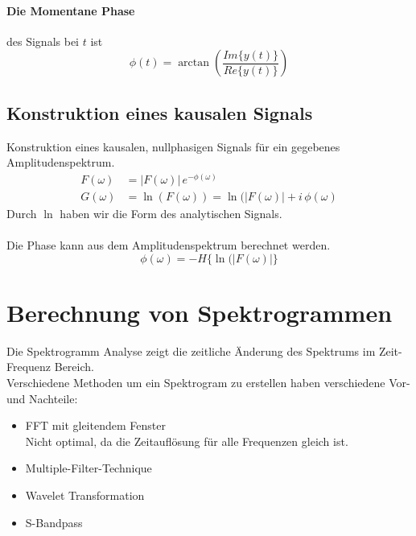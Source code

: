 \paragraph{Die Momentane Phase} des Signals bei $t$ ist
\[
\phi(t) = \arctan\left( \frac{Im\{y(t)\}}{Re\{y(t)\}} \right)
\]
\subsection{Konstruktion eines kausalen Signals}
Konstruktion eines kausalen, nullphasigen Signals für ein gegebenes Amplitudenspektrum.
\[
\begin{split}
F(\omega) & = |F(\omega)|\, e^{-\phi(\omega)}\\
G(\omega) & = \ln(F(\omega)) = \ln(|F(\omega)| + i\,\phi(\omega)
\end{split}
\]
Durch $\ln$ haben wir die Form des analytischen Signals.\\\\
Die Phase kann aus dem Amplitudenspektrum berechnet werden.
\[
\phi(\omega) = -H\{\ln(|F(\omega)|\}
\]

\section{Berechnung von Spektrogrammen}
Die Spektrogramm Analyse zeigt die zeitliche Änderung des Spektrums im Zeit-Frequenz Bereich.\\
Verschiedene Methoden um ein Spektrogram zu erstellen haben verschiedene Vor- und Nachteile:
\begin{itemize}
\item FFT mit gleitendem Fenster\\
Nicht optimal, da die Zeitauflösung für alle Frequenzen gleich ist.
\item Multiple-Filter-Technique
\item Wavelet Transformation
\item S-Bandpass
\end{itemize}

